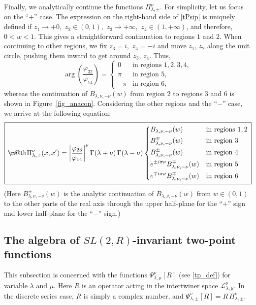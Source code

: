 \documentclass[12pt]{article}
\makeatletter
\newcommand*{\wideboxed}[1]{\setlength{\fboxsep}{1ex}%
  \fbox{\m@th$\displaystyle#1$}}
\newcommand{\lt}{\left}
\newcommand{\rt}{\right}
\newcommand{\vp}{\varphi}
\newcommand{\calL}{\mathcal{L}}
\newcommand{\RR}{\mathbb{R}}
\DeclareMathOperator{\SL}{SL}
\newcommand{\lam}{\lambda}
\def\widetilde#1{#1}%
\def\SL{SL}
\def\RR{R}
\makeatother
\begin{document}
Finally, we analytically continue the functions $\Pi^{\nu}_{\lambda,\pm}$. For simplicity, let us focus on the ``$+$'' case. The expression on the right-hand side of \eqref{tPsip} is uniquely defined if $z_1\to+0$,\, $z_2\in(0,1)$,\, $z_3\to+\infty$,\, $z_4\in(1,+\infty)$, and therefore, $0<w<1$. This gives a straightforward continuation to regions $1$ and $2$. When continuing to other regions, we fix $z_3=i$,\, $z_4=-i$ and move $z_1$, $z_2$ along the unit circle, pushing them inward to get around $z_3$, $z_4$. Thus,
\begin{equation}
\arg\lt(\frac{\vp_{32}}{\vp_{14}}\rt)=\begin{cases}
0 & \text{in regions } 1,2,3,4,\\
\pi & \text{in region } 5,\\
-\pi & \text{in region } 6,
\end{cases}
\end{equation}
whereas the continuation of $B_{\lambda,\nu,-\nu}(w)$ from region $2$ to regions $3$ and $6$ is shown in Figure~\ref{fig_anacon}. Considering the other regions and the ``$-$'' case, we arrive at the following equation:
\begin{equation}\label{tpf-disc}
\wideboxed{
\Pi^{\nu}_{\lambda,\pm}(x,x')
=\left|\frac{\vp_{23}}{\vp_{14}}\right|^{\nu}
\Gamma(\lambda+\nu)\,\Gamma(\lambda-\nu)
\begin{dcases}
B_{\lam, \nu, -\nu}(w) & \text{in regions } 1, 2\\
B^{\mp}_{\lam, \nu, -\nu}(w) & \text{in region } 3\\
B^{\pm}_{\lam, \nu, -\nu}(w) & \text{in region } 4\\
e^{\pm i \pi \nu}B^{\mp}_{\lam, \nu, -\nu}(w) & \text{in region } 5\\
e^{\mp i \pi \nu}B^{\mp}_{\lam, \nu, -\nu}(w) & \text{in region } 6
\end{dcases}
}
\end{equation}
(Here $B^{\pm}_{\lam,\nu,-\nu}(w)$ is the analytic continuation of $B_{\lam,\nu,-\nu}(w)$ from $w\in(0,1)$ to the other parts of the real axis through the upper half-plane for the ``$+$'' sign and lower half-plane for the ``$-$'' sign.)

\subsection{The algebra of $\widetilde{\SL}(2,\RR)$-invariant two-point functions}\label{app:opalg}

This subsection is concerned with the functions $\Psi^{\nu}_{\lambda,\mu}[R]$ (see \eqref{tp_def}) for variable $\lambda$ and $\mu$. Here $R$ is an operator acting in the intertwiner space $\calL^{\nu}_{\lambda,\mu}$. In the discrete series case, $R$ is simply a complex number, and $\Psi^{\nu}_{\lambda,\pm}[R]=R\,\Pi^{\nu}_{\lambda,\pm}$.
\end{document}
